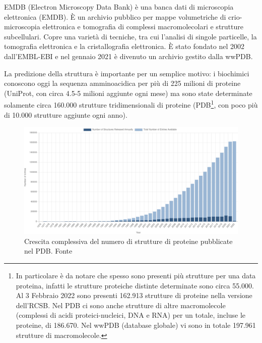 \par EMDB (Electron Microscopy Data Bank) è una banca dati di microscopia elettronica (EMDB). È un archivio pubblico per mappe volumetriche di crio-microscopia elettronica e tomografia di complessi macromolecolari e strutture subcellulari. Copre una varietà di tecniche, tra cui l'analisi di singole particelle, la tomografia elettronica e la cristallografia elettronica. È stato fondato nel 2002 dall'EMBL-EBI e nel gennaio 2021 è divenuto un archivio gestito dalla wwPDB. \\

\par La predizione della struttura è importante per un semplice motivo: i biochimici conoscono oggi la sequenza amminoacidica per più di 225 milioni di proteine\supercite{proteienDBentries} (UniProt, con circa 4.5-5 milioni aggiunte ogni mese) ma sono state determinate solamente circa 160.000 strutture tridimensionali di proteine\supercite{proteienDBentries} (PDB\footnote{In particolare è da notare che spesso sono presenti più strutture per una data proteina, infatti le strutture proteiche distinte determinate sono circa 55.000. Al 3 Febbraio 2022 sono presenti 162.913 strutture di proteine nella versione dell'RCSB. Nel PDB ci sono anche strutture di altre macromolecole (complessi di acidi proteici-nucleici, DNA e RNA) per un totale, incluse le proteine, di 186.670\supercite{pdbStats}. Nel wwPDB (database globale) vi sono in totale 197.961 strutture di macromolecole\supercite{wwpdbStats}.}, con poco più di 10.000 strutture aggiunte ogni anno). 

\begin{figure}[!htb]
	\centering
	\includegraphics[scale=0.3]{images/pdb-statistica.png}
	\caption{Crescita complessiva del numero di strutture di proteine pubblicate nel PDB. Fonte\cite{pdbStats}}
	\label{fig:pdb-statistica}
\end{figure}


